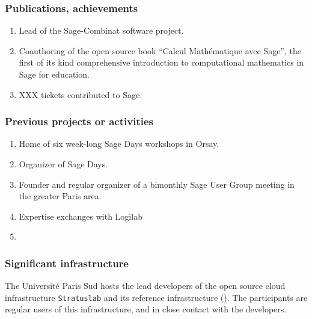 \subsubsection*{Publications, achievements}


\begin{enumerate}
\item Lead of the Sage-Combinat software project.
\item Coauthoring of the open source book ``Calcul Mathématique avec
  Sage'', the first of its kind comprehensive introduction to
  computational mathematics in Sage for education.
\item XXX tickets contributed to Sage.
\end{enumerate}


\subsubsection*{Previous projects or activities}

\begin{enumerate}
\item Home of six week-long Sage Days workshops in Orsay.
\item Organizer of  Sage Days.
\item Founder and regular organizer of a bimonthly Sage User Group
  meeting in the greater Paris area.
\item Expertise exchanges with Logilab
\item {}
\end{enumerate}

\subsubsection*{Significant infrastructure}

The Université Paris Sud hosts the lead developers of the open source
cloud infrastructure \texttt{Stratuslab} and its reference
infrastructure (). The participants are regular users
of this infrastructure, and in close contact with the developers.
